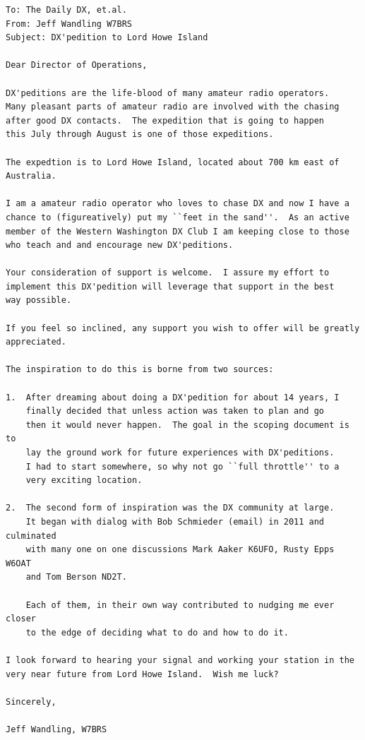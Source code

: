 \documentclass[11pt]{article}
\begin{document}
\begin{Verbatim}[fontsize=\small]
To: The Daily DX, et.al.
From: Jeff Wandling W7BRS
Subject: DX'pedition to Lord Howe Island

Dear Director of Operations,

DX'peditions are the life-blood of many amateur radio operators.
Many pleasant parts of amateur radio are involved with the chasing
after good DX contacts.  The expedition that is going to happen
this July through August is one of those expeditions.

The expedtion is to Lord Howe Island, located about 700 km east of Australia.

I am a amateur radio operator who loves to chase DX and now I have a 
chance to (figureatively) put my ``feet in the sand''.  As an active
member of the Western Washington DX Club I am keeping close to those
who teach and and encourage new DX'peditions.

Your consideration of support is welcome.  I assure my effort to 
implement this DX'pedition will leverage that support in the best
way possible.

If you feel so inclined, any support you wish to offer will be greatly
appreciated.

The inspiration to do this is borne from two sources:

1.  After dreaming about doing a DX'pedition for about 14 years, I
    finally decided that unless action was taken to plan and go
    then it would never happen.  The goal in the scoping document is to 
    lay the ground work for future experiences with DX'peditions.  
    I had to start somewhere, so why not go ``full throttle'' to a 
    very exciting location.

2.  The second form of inspiration was the DX community at large.
    It began with dialog with Bob Schmieder (email) in 2011 and culminated
    with many one on one discussions Mark Aaker K6UFO, Rusty Epps W6OAT
    and Tom Berson ND2T.

    Each of them, in their own way contributed to nudging me ever closer 
    to the edge of deciding what to do and how to do it.

I look forward to hearing your signal and working your station in the
very near future from Lord Howe Island.  Wish me luck?

Sincerely,

Jeff Wandling, W7BRS
\end{Verbatim}

\newpage
\printglossary
\newpage
{}
\printindex
\end{document}
